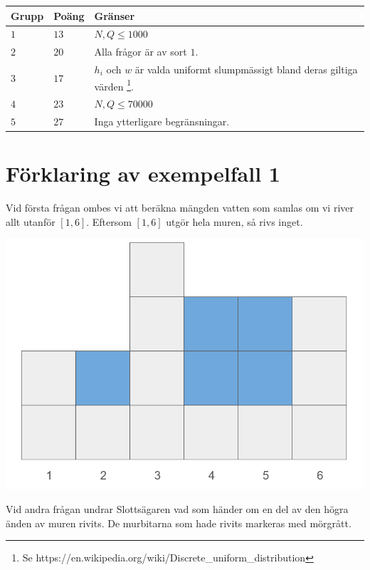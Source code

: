 \noindent
\begin{tabular}{| l | l | p{12cm} |}
  \hline
  \textbf{Grupp} & \textbf{Poäng} & \textbf{Gränser} \\ \hline
  $1$    & $13$       & $N, Q \leq 1000$ \\ \hline
  $2$    & $20$       & Alla frågor är av sort $1$. \\ \hline
  $3$    & $17$       & $h_i$ och $w$ är valda uniformt slumpmässigt bland deras giltiga värden \footnote{Se https://en.wikipedia.org/wiki/Discrete\_uniform\_distribution}. \\ \hline
  $4$    & $23$       & $N, Q \leq 70000$ \\ \hline
  $5$    & $27$       & Inga ytterligare begränsningar. \\ \hline
\end{tabular}

\section*{Förklaring av exempelfall 1}
Vid första frågan ombes vi att beräkna mängden vatten som samlas om vi river allt utanför $[1,6]$. Eftersom
$[1,6]$ utgör hela muren, så rivs inget.
\begin{center}
  \includegraphics[scale=0.2]{mur2.png}
\end{center}

Vid andra frågan undrar Slottsägaren vad som händer om en del av den högra änden av muren rivits.
De murbitarna som hade rivits markeras med mörgrått. 

